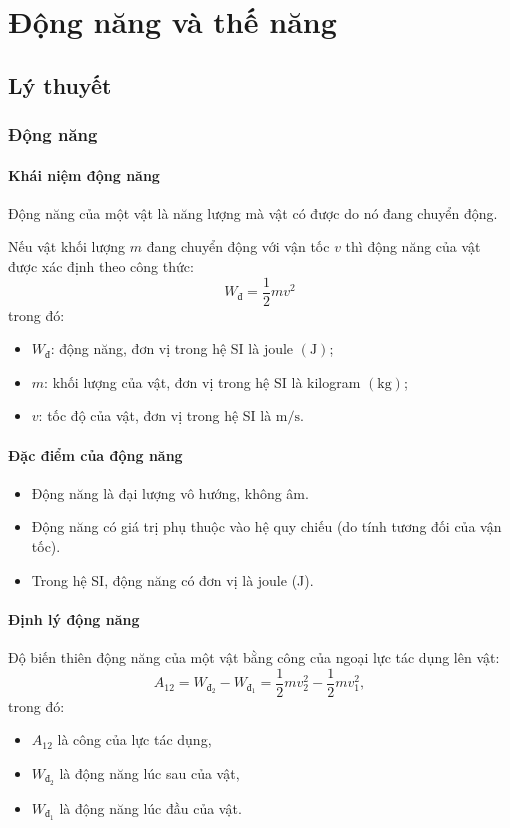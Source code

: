 \let\lesson\undefined
\newcommand{\lesson}{\phantomlesson{Bài 17: Động năng và thế năng. Định luật bảo toàn cơ năng}}
\chapter[Động năng và thế năng]{Động năng và thế năng}
\setcounter{section}{0}
\section{Lý thuyết}
\subsection{Động năng}
\subsubsection{Khái niệm động năng}
Động năng của một vật là năng lượng mà vật có được do nó đang chuyển động. 

Nếu vật khối lượng $m$ đang chuyển động với vận tốc $v$ thì động năng của vật được xác định theo công thức:
\begin{equation*}
	W_{\text{đ}} =\dfrac{1}{2}mv^2
\end{equation*}
trong đó:
\begin{itemize}
	\item $W_{\text{đ}}$: động năng, đơn vị trong hệ SI là joule $\left(\si{\joule}\right)$;
	\item $m$: khối lượng của vật, đơn vị trong hệ SI là kilogram $\left(\si{\kilogram}\right)$;
	\item $v$: tốc độ của vật, đơn vị trong hệ SI là $\si{\meter/\second}$.
\end{itemize}
\subsubsection{Đặc điểm của động năng}
\begin{itemize}
	\item Động năng là đại lượng vô hướng, không âm.
	\item Động năng có giá trị phụ thuộc vào hệ quy chiếu (do tính tương đối của vận tốc).
	\item Trong hệ SI, động năng có đơn vị là joule (J). 
\end{itemize}
\subsubsection{Định lý động năng}
Độ biến thiên động năng của một vật bằng công của ngoại lực tác dụng lên vật:
\begin{equation*}
	A_{12} = W_{\text{đ}_2}-W_{\text{đ}_1}= \dfrac{1}{2}mv^2_2-\dfrac{1}{2}mv^2_1,
\end{equation*}
trong đó:
\begin{itemize}
	\item $A_{12}$ là công của lực tác dụng,
	\item $W_{\text{đ}_2}$ là động năng lúc sau của vật,
	\item $W_{\text{đ}_1}$ là động năng lúc đầu của vật.
\end{itemize} 

